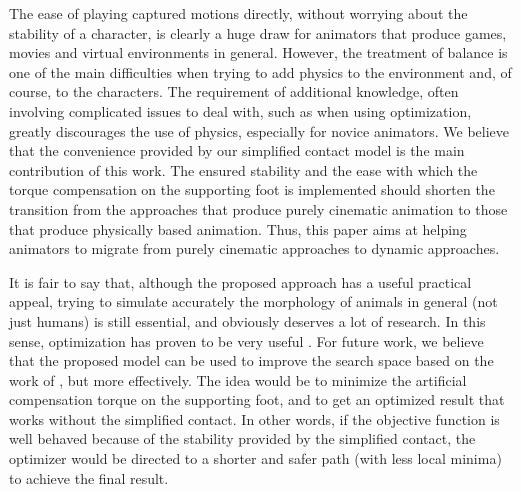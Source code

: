 \documentclass[tog]{acmsiggraph}
\begin{document}
The ease of playing captured motions directly, without worrying about the stability of a character, is clearly a huge draw for animators that 
produce games, movies and virtual environments in general. However, the treatment of balance is one of the main difficulties when trying to add 
physics to the environment and, of course, to the characters. The requirement of additional knowledge, often involving complicated issues to deal
with, such as when using optimization, greatly discourages the use of physics, especially for novice animators. We believe that the convenience
provided by our simplified contact model is the main contribution of this work. The ensured stability and the ease with which the torque
compensation on the supporting foot is implemented should shorten the transition from the approaches that produce purely cinematic animation to
those that produce physically based animation. Thus, this paper aims at helping animators to migrate from purely cinematic approaches to dynamic
approaches.

It is fair to say that, although the proposed approach has a useful practical appeal, trying to simulate accurately the morphology of animals in
general (not just humans) is still essential, and obviously deserves a lot of research. In this sense, optimization has proven to be very useful 
\cite{bib:Nunes12} \cite{bib:Geijtenbeek12} \cite{bib:Wang12} \cite{bib:Geijtenbeek13}. For future work, we believe that the proposed model can
be used to improve the search space based on the work of \cite{bib:Panne95}, but more effectively. The idea would be to minimize the artificial 
compensation torque on the supporting foot, and to get an optimized result that works without the simplified contact. In other words, if the 
objective function is well behaved because of the stability provided by the simplified contact, the optimizer would be directed to a shorter 
and safer path (with less local minima) to achieve the final result.

\end{document}
